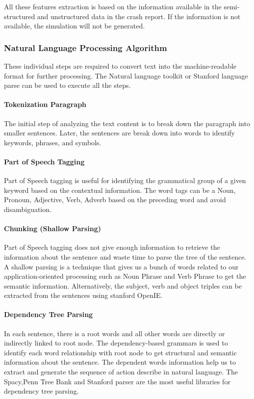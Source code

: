 All these features extraction is based on the information available in the semi-structured and unstructured data in the crash report. If the information is not available, the simulation will not be generated.

\subsubsection{Natural Language Processing Algorithm}
These individual steps are required to convert text into the machine-readable format for further processing.  The Natural language toolkit or Stanford language parse can be used to execute all the steps.

\paragraph{Tokenization Paragraph}
The initial step of analyzing the text content is to break down the paragraph into smaller sentences. Later, the sentences are break down into words to identify keywords, phrases, and symbols. 

\paragraph{Part of Speech Tagging}
Part of Speech tagging is useful for identifying the grammatical group of a given keyword based on the contextual information.  The word tags can be a Noun, Pronoun, Adjective, Verb, Adverb based on the preceding word and avoid disambiguation. 

\paragraph{Chunking (Shallow Parsing)}
Part of Speech tagging does not give enough information to retrieve the information about the sentence and waste time to parse the tree of the sentence. A shallow parsing is a technique that gives us a bunch of words related to our application-oriented processing such as Noun Phrase and Verb Phrase to get the semantic information. Alternatively, the subject, verb and object triples can be extracted from the sentences using stanford OpenIE. 

\paragraph{Dependency Tree Parsing}
In each sentence, there is a root words and all other words are directly or indirectly linked to root node. The dependency-based grammars is used to identify each word relationship with root node to get structural and semantic information about the sentence. The dependent words information help us to extract and generate the sequence of action describe in natural language. The Spacy,Penn Tree Bank and Stanford parser are the most useful libraries for dependency tree parsing. 

